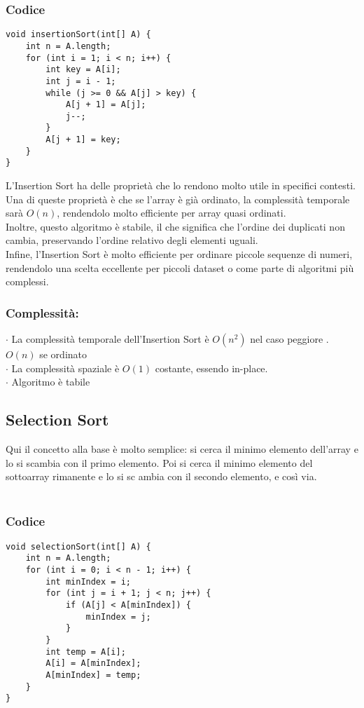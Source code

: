 \documentclass[a4paper,12pt]{article}
\begin{document}
\subsubsection{{\textcolor{codice}{Codice}}}
\begin{lstlisting}[style=mystyle]
void insertionSort(int[] A) {
    int n = A.length;
    for (int i = 1; i < n; i++) {
        int key = A[i];
        int j = i - 1;
        while (j >= 0 && A[j] > key) {
            A[j + 1] = A[j];
            j--;
        }
        A[j + 1] = key;
    }
}
\end{lstlisting}

L'Insertion Sort ha delle proprietà che lo rendono molto utile in specifici contesti. Una di queste proprietà è che se l'array è già ordinato, la complessità temporale sarà $O(n)$, rendendolo molto efficiente per array quasi ordinati.\\
Inoltre, questo algoritmo è stabile, il che significa che l'ordine dei duplicati non cambia, preservando l'ordine relativo degli elementi uguali.\\
Infine, l'Insertion Sort è molto efficiente per ordinare piccole sequenze di numeri, rendendolo una scelta eccellente per piccoli dataset o come parte di algoritmi più complessi.

\subsubsection*{{\textcolor{teorema}{Complessità: }}}
$\cdot $ La complessità temporale dell'Insertion Sort è $O(n^2)$ nel caso peggiore .  $O(n)$ se ordinato \\
$\cdot $ La complessità spaziale è $O(1)$ costante, essendo in-place. \\
$\cdot $ Algoritmo è tabile

\subsection{Selection Sort}
Qui il concetto alla base è molto semplice: si cerca il minimo elemento dell'array e lo si scambia con il primo elemento. Poi si cerca il minimo elemento del sottoarray rimanente e lo si sc
ambia con il secondo elemento, e così via. \\
\\
\subsubsection{{\textcolor{codice}{Codice}}}
\begin{lstlisting}[style=mystyle]
void selectionSort(int[] A) {
    int n = A.length;
    for (int i = 0; i < n - 1; i++) {
        int minIndex = i;
        for (int j = i + 1; j < n; j++) {
            if (A[j] < A[minIndex]) {
                minIndex = j;
            }
        }
        int temp = A[i];
        A[i] = A[minIndex];
        A[minIndex] = temp;
    }
}
\end{lstlisting}
\end{document}
